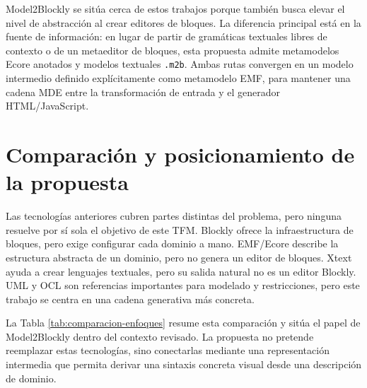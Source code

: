 Model2Blockly se sitúa cerca de estos trabajos porque también busca elevar el
nivel de abstracción al crear editores de bloques. La diferencia principal está
en la fuente de información: en lugar de partir de gramáticas textuales libres de
contexto o de un metaeditor de bloques, esta propuesta admite metamodelos Ecore
anotados y modelos textuales \texttt{.m2b}. Ambas rutas convergen en un modelo
intermedio definido explícitamente como metamodelo EMF, para mantener una cadena
MDE entre la transformación de entrada y el generador HTML/JavaScript.

\section{Comparación y posicionamiento de la propuesta}
\label{sec:comparacion-posicionamiento}

Las tecnologías anteriores cubren partes distintas del problema, pero ninguna
resuelve por sí sola el objetivo de este TFM. Blockly ofrece la infraestructura
de bloques, pero exige configurar cada dominio a mano. EMF/Ecore describe la
estructura abstracta de un dominio, pero no genera un editor de bloques. Xtext
ayuda a crear lenguajes textuales, pero su salida natural no es un editor
Blockly. UML y OCL son referencias importantes para modelado y restricciones,
pero este trabajo se centra en una cadena generativa más concreta.

La Tabla \ref{tab:comparacion-enfoques} resume esta comparación y sitúa el papel
de Model2Blockly dentro del contexto revisado. La propuesta no pretende reemplazar
estas tecnologías, sino conectarlas mediante una representación intermedia que
permita derivar una sintaxis concreta visual desde una descripción de dominio.

